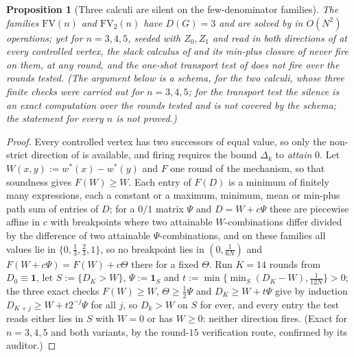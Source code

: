 \documentclass[11pt]{article}
\theoremstyle{plain}
\newtheorem{proposition}[theorem]{Proposition}
\theoremstyle{definition}
\newcommand{\bbone}{\mathbf{1}}
\begin{document}
\begin{proposition}[Three calculi are silent on the few-denominator families]\label{prop:fv-stall}
The families $\mathrm{FV}(n)$ and $\mathrm{FV}_2(n)$ have $D(G)=3$ and
are solved by  in $O(N^{2})$ operations; yet
for $n=3,4,5$, seeded with $Z_0,Z_1$ and read in both directions of
 at every controlled vertex, the slack calculus of
 and its min-plus closure of  never
fire on them, at any round, and the one-shot transport test of
 does not fire over the rounds tested. (The argument
below is a schema, for the two calculi, whose three
finite checks were carried out for $n=3,4,5$; for the transport test the
silence is an exact computation over the rounds tested and is not covered
by the schema; the statement for every $n$ is not proved.)
\end{proposition}

\begin{proof}
Every controlled vertex has two successors of equal value, so only the
non-strict direction of  is available, and firing
requires the bound $\Delta_k$ to \emph{attain} $0$. Let $W(x,y):=w^{\ast}(x)-w^{\ast}(y)$
and $F$ one round of the mechanism, so that soundness gives
$F(W)\ge W$. Each entry of $F(D)$ is a minimum of finitely many
expressions, each a constant or a maximum, minimum, mean or min-plus path
sum of entries of $D$; for a $0/1$ matrix $\Psi$ and $D=W+c\Psi$ these are
piecewise affine in $c$ with breakpoints where two attainable
$W$-combinations differ divided by the difference of two attainable
$\Psi$-combinations, and on these families all values lie in
$\{0,\tfrac13,\tfrac23,1\}$, so no breakpoint lies in $(0,\tfrac1{6N})$ and
$F(W+c\Psi)=F(W)+c\Theta$ there for a fixed $\Theta$. Run $K=14$ rounds
from $D_0\equiv\bbone$, let $S:=\{D_K>W\}$, $\Psi:=\bbone_S$ and
$t:=\min\{\min_S(D_K-W),\tfrac1{12N}\}>0$; the three exact checks
$F(W)\ge W$, $\Theta\ge\tfrac12\Psi$ and $D_K\ge W+t\Psi$ give by
induction $D_{K+j}\ge W+t2^{-j}\Psi$ for all $j$, so $D_k>W$ on $S$ for
ever, and every entry the test reads either lies in $S$ with $W=0$ or has
$W\ge0$: neither direction fires. (Exact for $n=3,4,5$ and both variants,
by the round-$15$ verification route, confirmed by its auditor.)
\end{proof}
\end{document}
